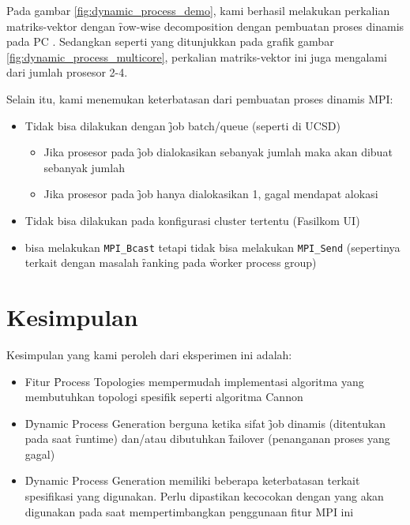 Pada gambar \ref{fig:dynamic_process_demo}, kami berhasil melakukan perkalian matriks-vektor dengan \f{row-wise decomposition} dengan pembuatan proses dinamis pada PC . Sedangkan seperti yang ditunjukkan pada grafik gambar \ref{fig:dynamic_process_multicore}, perkalian matriks-vektor ini juga mengalami \speedup dari jumlah prosesor 2-4.

Selain itu, kami menemukan keterbatasan dari pembuatan proses dinamis MPI:

\begin{itemize}
	\item Tidak bisa dilakukan dengan \f{job batch/queue} (seperti di \cluster UCSD)
	\begin{itemize}
		\item Jika prosesor pada \f{job} dialokasikan sebanyak jumlah \worker maka \manager akan dibuat sebanyak jumlah \worker
		\item Jika prosesor pada \f{job} hanya dialokasikan 1, \worker gagal mendapat alokasi
	\end{itemize}
	\item Tidak bisa dilakukan pada konfigurasi cluster tertentu (\cluster Fasilkom UI)
	\item \Manager bisa melakukan \verb|MPI_Bcast| tetapi tidak bisa melakukan \verb|MPI_Send| (sepertinya terkait dengan masalah \f{ranking} pada \f{worker process group})	
\end{itemize}

\section{Kesimpulan}

Kesimpulan yang kami peroleh dari eksperimen ini adalah:

\begin{itemize}
	\item Fitur \f{Process Topologies} mempermudah implementasi algoritma yang membutuhkan topologi spesifik seperti algoritma Cannon
	\item \f{Dynamic Process Generation} berguna ketika sifat \f{job} dinamis (ditentukan pada saat \f{runtime}) dan/atau dibutuhkan \f{failover} (penanganan proses yang gagal)
	\item \f{Dynamic Process Generation} memiliki beberapa keterbatasan terkait spesifikasi \cluster yang digunakan. Perlu dipastikan kecocokan dengan \cluster yang akan digunakan pada saat mempertimbangkan penggunaan fitur MPI ini
\end{itemize}